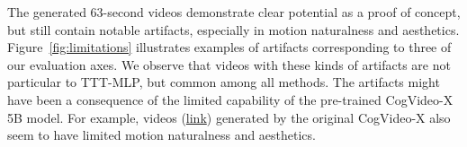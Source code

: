 The generated 63-second videos demonstrate clear potential as a proof of concept, but still contain notable artifacts, especially in motion naturalness and aesthetics. Figure~\ref{fig:limitations} illustrates examples of artifacts corresponding to three of our evaluation axes.
We observe that videos with these kinds of artifacts are not particular to TTT-MLP, but common among all methods.
The artifacts might have been a consequence of the limited capability of the pre-trained CogVideo-X 5B model.
For example,
videos (\href{https://github.com/THUDM/CogVideo}{link}) generated by the original CogVideo-X also seem to have limited motion naturalness and aesthetics.
